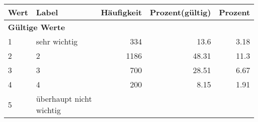      \begin{longtable}{lXrrr}
     \toprule
     \textbf{Wert} & \textbf{Label} & \textbf{Häufigkeit} & \textbf{Prozent(gültig)} & \textbf{Prozent} \\
     \endhead
     \midrule
     \multicolumn{5}{l}{\textbf{Gültige Werte}}\\

     1 &
     \multicolumn{1}{X}{ sehr wichtig   } &


       \num{334} &
       \num[round-mode=places,round-precision=2]{13,6} &
         \num[round-mode=places,round-precision=2]{3,18} \\

     2 &
     \multicolumn{1}{X}{ 2   } &


       \num{1186} &
       \num[round-mode=places,round-precision=2]{48,31} &
         \num[round-mode=places,round-precision=2]{11,3} \\

     3 &
     \multicolumn{1}{X}{ 3   } &


       \num{700} &
       \num[round-mode=places,round-precision=2]{28,51} &
         \num[round-mode=places,round-precision=2]{6,67} \\

     4 &
     \multicolumn{1}{X}{ 4   } &


       \num{200} &
       \num[round-mode=places,round-precision=2]{8,15} &
         \num[round-mode=places,round-precision=2]{1,91} \\

     5 &
     \multicolumn{1}{X}{ überhaupt nicht wichtig   } &



\end{longtable}
